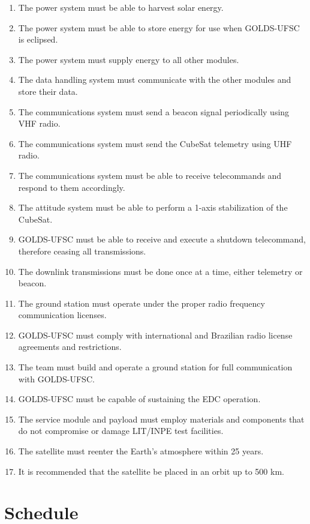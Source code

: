 \begin{enumerate}
    \item The power system must be able to harvest solar energy.
    \item The power system must be able to store energy for use when GOLDS-UFSC is eclipsed.
    \item The power system must supply energy to all other modules.
    \item The data handling system must communicate with the other modules and store their data.
    \item The communications system must send a beacon signal periodically using VHF radio.
    \item The communications system must send the CubeSat telemetry using UHF radio.
    \item The communications system must be able to receive telecommands and respond to them accordingly.
    \item The attitude system must be able to perform a 1-axis stabilization of the CubeSat.
    \item GOLDS-UFSC must be able to receive and execute a shutdown telecommand, therefore ceasing all transmissions.
    \item The downlink transmissions must be done once at a time, either telemetry or beacon.
    \item The ground station must operate under the proper radio frequency communication licenses.
    \item GOLDS-UFSC must comply with international and Brazilian radio license agreements and restrictions.
    \item The team must build and operate a ground station for full communication with GOLDS-UFSC.
    \item GOLDS-UFSC must be capable of sustaining the EDC operation.
    \item The service module and payload must employ materials and components that do not compromise or damage LIT/INPE test facilities.
    \item The satellite must reenter the Earth's atmosphere within 25 years.
    \item It is recommended that the satellite be placed in an orbit up to 500 km.
\end{enumerate}

\section{Schedule}

